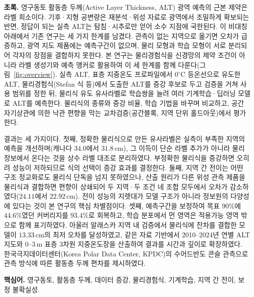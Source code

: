 \documentclass[10pt,twocolumn]{article}
\begin{document}
\begin{@twocolumnfalse}
{\small\linespread{1.12}\selectfont
\begin{list}{}{\setlength{\leftmargin}{7mm}\setlength{\rightmargin}{7mm}}
\item[]
\noindent\textbf{초록.}\;
영구동토 활동층 두께(Active Layer Thickness, ALT) 광역 예측의 근본 제약은 라벨 희소이다. 기후·지형 공변량은 재분석·위성 자료로 광역에서 조밀하게 확보되는 반면, 정답이 되는 실측 ALT는 탐침·시추로만 얻어 소수 지점에 국한된다. 이 비대칭 아래에서 기존 연구는 세 가지 한계를 남겼다. 관측이 없는 지역으로 옮기면 오차가 급증하고, 광역 지도 제품에는 예측구간이 없으며, 물리 모형과 학습 모형이 서로 분리되어 각자의 장점을 결합하지 못한다. 본 연구는 물리경험식을 신경망의 제약 조건이 아니라 라벨 생성기와 예측 앵커로 활용하여 이 세 한계를 함께 다룬다(그림~\ref{fig:overview}). 실측 ALT, 표층 지중온도 프로파일에서 $0^\circ\mathrm{C}$ 등온선으로 유도한 ALT, 물리경험식(Stefan 식 등)에서 도출한 ALT를 증강 후보로 두고 검증을 거쳐 사용 범위를 정한 뒤, 물리식 유도 유사라벨로 학습쌍을 늘려 여러 기계학습·딥러닝 모델로 ALT를 예측한다. 물리식의 종류와 증강 비율, 학습 기법을 바꾸며 비교하고, 공간 자기상관에 의한 낙관 편향을 막는 교차검증(공간블록, 지역 단위 홀드아웃)에서 평가한다.
\vspace{2pt}\par
결과는 세 가지이다. 첫째, 정확한 물리식으로 만든 유사라벨은 실측이 부족한 지역의 예측을 개선하며(캐나다 $34.0$에서 $31.8\,\mathrm{cm}$), 그 이득이 단순 라벨 추가가 아니라 물리 정보에서 온다는 것을 상수 라벨 대조로 분리하였다. 부정확한 물리식을 증강하면 오히려 성능이 저하되므로 식의 선택이 증강 효과를 결정한다. 둘째, 지역 간 전이는 어떤 구조 정교화로도 물리식 단독을 넘지 못하였으나, 산출 원리가 다른 위성 관측 제품을 물리식과 결합하면 편향이 상쇄되어 두 지역·두 조건 네 조합 모두에서 오차가 감소하였다($24.11$에서 $22.92\,\mathrm{cm}$). 전이 성능의 지렛대가 모델 구조가 아니라 정보원의 다양성에 있다는 것이 본 연구의 핵심 차별점이다. 셋째, 예측구간을 보정하여 목표 $90\%$에 $44.6\%$였던 커버리지를 $93.4\%$로 회복하고, 학습 분포에서 먼 영역은 적용가능 영역 밖으로 함께 표기하였다. 아울러 알래스카 지역 내 검증에서 물리식에 잔차를 결합한 모델이 $13.33\,\mathrm{cm}$의 최저 오차를 달성하였고, 같은 자료 기반에서 2010--2024년 연별 ALT 지도와 $0\text{--}3\,\mathrm{m}$ 표층 3차원 지중온도장을 산출하여 결과를 시간과 깊이로 확장하였다. 한국극지데이터센터(Korea Polar Data Center, KPDC)의 수어드반도 콘슬 관측으로 관측 방식에 따른 활동층 두께 편차를 제시하였다.
\vspace{3pt}\par
\noindent\textbf{핵심어.}\; 영구동토, 활동층 두께, 데이터 증강, 물리경험식, 기계학습, 지역 간 전이, 보정 불확실성.

\end{list}}
\end{@twocolumnfalse}
\end{document}
